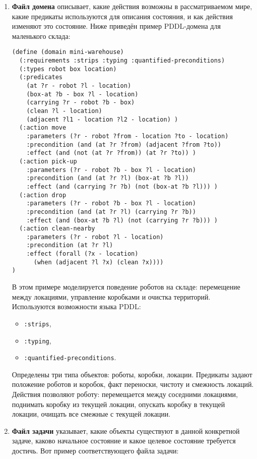 \begin{enumerate}
\item \textbf{Файл домена} описывает, какие действия возможны в рассматриваемом мире,
  какие предикаты используются для описания состояния,
    и как действия изменяют это состояние.
    Ниже приведён пример PDDL-домена для маленького склада:

  \begin{verbatim}
(define (domain mini-warehouse)
  (:requirements :strips :typing :quantified-preconditions)
  (:types robot box location)
  (:predicates
    (at ?r - robot ?l - location)
    (box-at ?b - box ?l - location)
    (carrying ?r - robot ?b - box)
    (clean ?l - location)
    (adjacent ?l1 - location ?l2 - location) )
  (:action move
    :parameters (?r - robot ?from - location ?to - location)
    :precondition (and (at ?r ?from) (adjacent ?from ?to))
    :effect (and (not (at ?r ?from)) (at ?r ?to)) )
  (:action pick-up
    :parameters (?r - robot ?b - box ?l - location)
    :precondition (and (at ?r ?l) (box-at ?b ?l))
    :effect (and (carrying ?r ?b) (not (box-at ?b ?l))) )
  (:action drop
    :parameters (?r - robot ?b - box ?l - location)
    :precondition (and (at ?r ?l) (carrying ?r ?b))
    :effect (and (box-at ?b ?l) (not (carrying ?r ?b))) )
  (:action clean-nearby
    :parameters (?r - robot ?l - location)
    :precondition (at ?r ?l)
    :effect (forall (?x - location)
      (when (adjacent ?l ?x) (clean ?x))))
)
  \end{verbatim}

    В этом примере моделируется поведение роботов на складе:
    перемещение между локациями, управление коробками и очистка территорий.
    Используются возможности языка PDDL:
    \begin{itemize}
      \item \texttt{:strips},
      \item \texttt{:typing},
      \item \texttt{:quantified-preconditions}.
    \end{itemize}
    Определены три типа объектов: роботы, коробки, локации.
    Предикаты задают положение роботов и коробок, факт переноски, чистоту и смежность локаций.
    Действия позволяют роботу: перемещается между соседними локациями,
    поднимать коробку из текущей локации, опускать коробку в текущей локации, очищать все смежные с текущей локации.

\item \textbf{Файл задачи} указывает,
  какие объекты существуют в данной конкретной задаче,
    каково начальное состояние и какое целевое состояние требуется достичь.
    Вот пример соответствующего файла задачи:


\end{enumerate}
